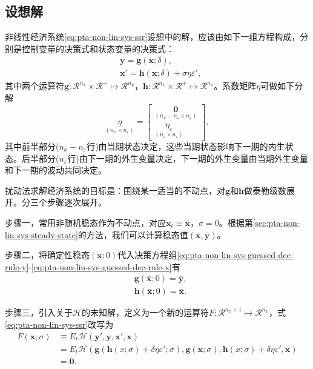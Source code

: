 \subsection{设想解}
非线性经济系统\eqref{eq:pta-non-lin-sys-ssr}设想中的解，应该由如下一组方程构成，分别是控制变量的决策式和状态变量的决策式：
\begin{align}
  \label{eq:pta-non-lin-sys-guessed-dec-rule-y}
  &\bm{y} = \bm{g}(\bm{x};\delta), \\
  \label{eq:pta-non-lin-sys-guessed-dec-rule-x}
  &\bm{x}' = \bm{h}(\bm{x};\delta) + \sigma \eta \varepsilon',
\end{align}
其中两个运算符$\bm{g}:\mathcal{R}^{n_x} \times \mathcal{R}^{+} \mapsto \mathcal{R}^{n_y}$，$\bm{h}:\mathcal{R}^{n_x} \times \mathcal{R}^{+} \mapsto \mathcal{R}^{n_x}$。系数矩阵$\eta$可做如下分解
\begin{equation*}
  \underset{(n_x \times n_{\varepsilon})}{\eta} =
  \begin{bmatrix}
    \underset{(n_x - n_{\varepsilon} \times n_{\varepsilon})}{\bm{0}} \\
    \underset{(n_{\varepsilon} \times n_{\varepsilon})}{\eta_{\varepsilon}}
  \end{bmatrix},
\end{equation*}
其中前半部分($n_x-n_{\varepsilon}$行)由当期状态决定，这些当期状态影响下一期的内生状态。后半部分($n_{\varepsilon}$行)由下一期的外生变量决定，下一期的外生变量由当期外生变量和下一期的波动共同决定。

扰动法求解经济系统的目标是：围绕某一适当的不动点，对$\bm{g}$和$\bm{h}$做泰勒级数展开。分三个步骤逐次展开。

步骤一，常用非随机稳态作为不动点，对应$\bm{x}_t \equiv \bar{\bm{x}}$，$\sigma = 0$。根据第\ref{sec:pta-non-lin-sys-steady-state}的方法，我们可以计算稳态值$(\bar{\bm{x}}, \bar{\bm{y}} )$。

步骤二，将确定性稳态$(\bar{\bm{x}}; 0)$代入决策方程组\eqref{eq:pta-non-lin-sys-guessed-dec-rule-y}-\eqref{eq:pta-non-lin-sys-guessed-dec-rule-x}有
\begin{align}
  \label{eq:pta-guessed-dec-rule-y-ss}
  &\bm{g}(\bar{\bm{x}};0) = \bar{\bm{y}},\\
  \label{eq:pta-guessed-dec-rule-x-ss}
  &\bm{h}(\bar{\bm{x}};0) = \bar{\bm{x}}.
\end{align}

步骤三，引入关于$\mathcal{H}$的未知解，定义为一个新的运算符$F: \mathcal{R}^{n_{x}+1} \mapsto \mathcal{R}^{n_x}$，式\eqref{eq:pta-non-lin-sys-ssr}改写为
\begin{equation*}
  \begin{split}
    F(\bm{x},\sigma) &\equiv E_t \mathcal{H} \left(
    \bm{y}',\bm{y},\bm{x}',\bm{x}
    \right) \\
    &= E_t \mathcal{H} \left(
    \bm{g}\left( \bm{h}(x; \sigma) + \delta \eta \varepsilon'; \sigma \right),
    \bm{g} \left(\bm{x}; \sigma \right),
    \bm{h}(x;\sigma) + \delta \eta \varepsilon',
    \bm{x}
    \right) \\
    &= \bm{0}.
  \end{split}
\end{equation*}

